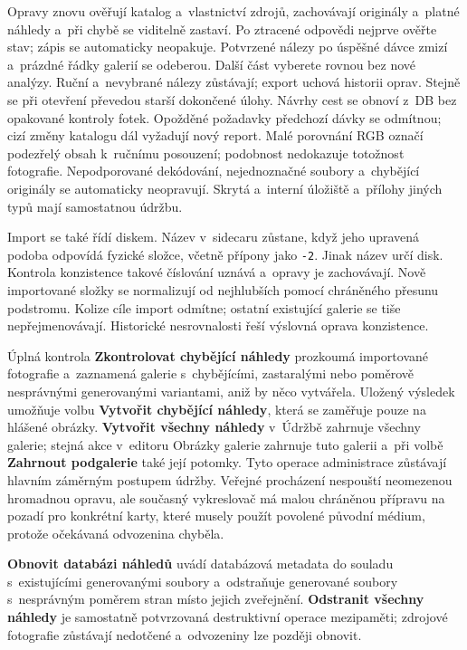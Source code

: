 \documentclass[11pt,a4paper]{article}
\newcommand{\ui}[1]{\textbf{#1}}
\newcommand{\codeword}[1]{\nolinkurl{#1}}
\begin{document}
Opravy znovu ověřují katalog a~vlastnictví zdrojů, zachovávají originály
a~platné náhledy a~při chybě se viditelně zastaví. Po ztracené odpovědi
nejprve ověřte stav; zápis se automaticky neopakuje. Potvrzené nálezy po úspěšné
dávce zmizí a~prázdné řádky galerií se odeberou. Další část vyberete rovnou
bez nové analýzy. Ruční a~nevybrané nálezy zůstávají; export uchová historii
oprav. Stejně se při otevření převedou starší dokončené úlohy. Návrhy cest se
obnoví z~DB bez opakované kontroly fotek. Opožděné požadavky předchozí dávky se
odmítnou; cizí změny katalogu dál vyžadují nový report. Malé porovnání RGB
označí podezřelý obsah k~ručnímu posouzení;
podobnost nedokazuje totožnost fotografie. Nepodporované dekódování,
nejednoznačné soubory a~chybějící originály se automaticky neopravují. Skrytá
a~interní úložiště a~přílohy jiných typů mají samostatnou údržbu.

Import se také řídí diskem. Název v~sidecaru zůstane, když jeho upravená
podoba odpovídá fyzické složce, včetně přípony jako \codeword{-2}.
Jinak název určí disk.
Kontrola konzistence takové číslování uznává a~opravy je zachovávají.
Nově importované složky se normalizují od nejhlubších pomocí chráněného
přesunu podstromu. Kolize cíle import odmítne; ostatní existující galerie se
tiše nepřejmenovávají. Historické nesrovnalosti řeší výslovná oprava
konzistence.

Úplná kontrola \ui{Zkontrolovat chybějící náhledy} prozkoumá importované
fotografie a~zaznamená galerie s~chybějícími, zastaralými nebo poměrově
nesprávnými generovanými variantami, aniž by něco vytvářela. Uložený výsledek
umožňuje volbu \ui{Vytvořit chybějící náhledy}, která se zaměřuje pouze na
hlášené obrázky. \ui{Vytvořit všechny náhledy} v~Údržbě zahrnuje všechny
galerie; stejná akce v~editoru Obrázky galerie zahrnuje tuto galerii a~při
volbě \ui{Zahrnout podgalerie} také její potomky. Tyto operace administrace
zůstávají hlavním záměrným postupem údržby. Veřejné procházení nespouští
neomezenou hromadnou opravu, ale současný vykreslovač má malou chráněnou
přípravu na pozadí pro konkrétní karty, které musely použít povolené původní
médium, protože očekávaná odvozenina chyběla.

\ui{Obnovit databázi náhledů} uvádí databázová metadata do souladu
s~existujícími generovanými soubory a~odstraňuje generované soubory
s~nesprávným poměrem stran místo jejich zveřejnění. \ui{Odstranit všechny
náhledy} je samostatně potvrzovaná destruktivní operace mezipaměti; zdrojové
fotografie zůstávají nedotčené a~odvozeniny lze později obnovit.
\end{document}
